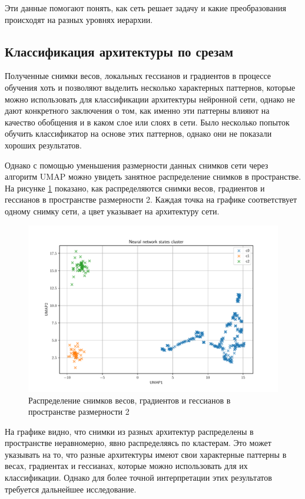 \documentclass[a4paper,12pt]{article}
\begin{document}
Эти данные помогают понять, как сеть решает задачу и какие преобразования происходят на разных уровнях иерархии.

\subsection{Классификация архитектуры по срезам}

Полученные снимки весов, локальных гессианов и градиентов в процессе обучения хоть и позволяют выделить
несколько характерных паттернов, которые можно использовать для классификации архитектуры нейронной сети,
однако не дают конкретного заключения о том, как именно эти паттерны влияют на качество обобщения и в каком
слое или слоях в сети. Было несколько попыток обучить классификатор на основе этих паттернов, однако они не
показали хороших результатов.

Однако с помощью уменьшения размерности данных снимков сети через алгоритм UMAP можно увидеть занятное
распределение снимков в пространстве. На рисунке \ref{fig:umap} показано, как распределяются снимки весов,
градиентов и гессианов в пространстве размерности 2. Каждая точка на графике соответствует одному снимку
сети, а цвет указывает на архитектуру сети.
\begin{figure}[ht]
  \centering
  \includegraphics[width=1\linewidth]{umap.pdf}
  \caption{Распределение снимков весов, градиентов и гессианов в пространстве размерности 2}
  \label{fig:umap}
\end{figure}

На графике видно, что снимки из разных архитектур распределены в пространстве неравномерно, явно
распределяясь по кластерам. Это может указывать на то, что разные архитектуры имеют свои характерные паттерны
в весах, градиентах и гессианах, которые можно использовать для их классификации. Однако для более точной
интерпретации этих результатов требуется дальнейшее исследование.
\end{document}
